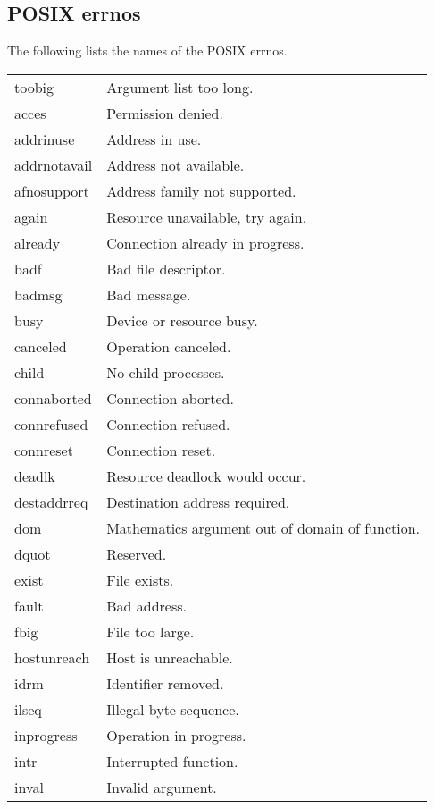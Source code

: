 \subsection{POSIX errnos}
The following lists the names of the POSIX errnos.
\begin{center}
\begin{longtable}{@{\ttfamily}lp{}}
   toobig			     & Argument list too long.\\
   acces				& Permission denied.\\
   addrinuse				& Address in use.\\
   addrnotavail			& Address not available.\\
   afnosupport		       & Address family not supported.\\
   again & Resource unavailable, try again.\\
   already			     & Connection already in progress.\\
   badf				& Bad file descriptor.\\
   badmsg				& Bad message.\\
   busy				& Device or resource busy.\\
   canceled				& Operation canceled.\\
   child				& No child processes.\\
   connaborted			& Connection aborted.\\
   connrefused			& Connection refused.\\
   connreset				& Connection reset.\\
   deadlk			      & Resource deadlock would occur.\\
   destaddrreq		       & Destination address required.\\
   dom	     & Mathematics argument out of domain of function.\\
   dquot				& Reserved.\\
   exist				& File exists.\\
   fault				& Bad address.\\
   fbig				& File too large.\\
   hostunreach			& Host is unreachable.\\
   idrm				& Identifier removed.\\
   ilseq				& Illegal byte sequence.\\
   inprogress				& Operation in progress.\\
   intr				& Interrupted function.\\
   inval				& Invalid argument.\\

\end{longtable}
\end{center}
